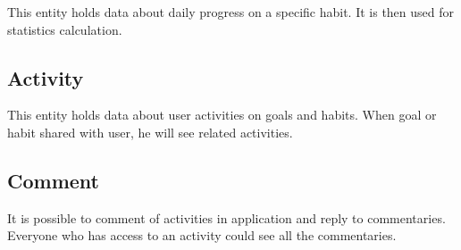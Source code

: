 This entity holds data about daily progress on a specific habit.
It is then used for statistics calculation.

\subsection{Activity}\label{subsec:activity}

This entity holds data about user activities on goals and habits.
When goal or habit shared with user, he will see related activities.

\subsection{Comment}\label{subsec:comment}

It is possible to comment of activities in application and reply to commentaries.
Everyone who has access to an activity could see all the commentaries.